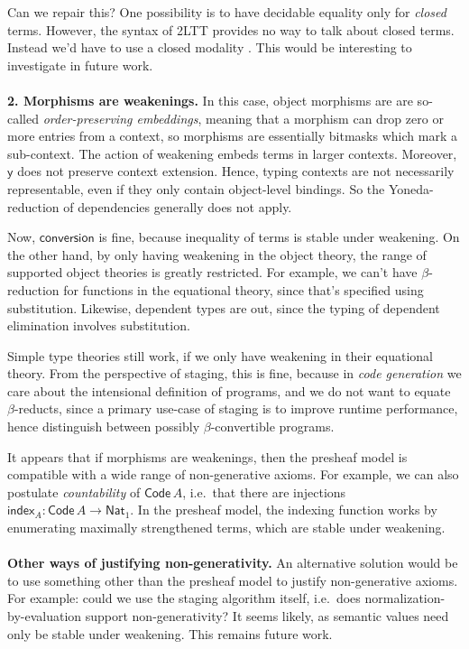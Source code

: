 \documentclass[11pt,a4paper,twoside]{article}
\newcommand{\msf}[1]{\mathsf{#1}}
\newcommand{\Code}{\mathsf{Code}}
\begin{document}
Can we repair this? One possibility is to have decidable equality only for
\emph{closed} terms. However, the syntax of 2LTT provides no way to talk about
closed terms. Instead we'd have to use a closed modality
\cite{bocquet2021induction}. This would be interesting to investigate in future
work.
\\\\
\textbf{2. Morphisms are weakenings.} In this case, object morphisms are are
so-called \emph{order-preserving embeddings}, meaning that a morphism can drop
zero or more entries from a context, so morphisms are essentially bitmasks which
mark a sub-context. The action of weakening embeds terms in larger
contexts. Moreover, $\msf{y}$ does not preserve context extension. Hence,
typing contexts are not necessarily representable, even if they only contain object-level
bindings. So the Yoneda-reduction of dependencies generally does not apply.

Now, $\msf{conversion}$ is fine, because inequality of terms is stable under
weakening. On the other hand, by only having weakening in the object theory, the
range of supported object theories is greatly restricted. For example, we can't
have $\beta$-reduction for functions in the equational theory, since that's
specified using substitution. Likewise, dependent types are out, since the
typing of dependent elimination involves substitution.

Simple type theories still work, if we only have weakening in their equational
theory. From the perspective of staging, this is fine, because in \emph{code
generation} we care about the intensional definition of programs, and we do not
want to equate $\beta$-reducts, since a primary use-case of staging is to
improve runtime performance, hence distinguish between possibly
$\beta$-convertible programs.

It appears that if morphisms are weakenings, then the presheaf model is
compatible with a wide range of non-generative axioms. For example, we can also
postulate \emph{countability} of $\Code\,A$, i.e.\ that there are injections
$\msf{index}_A : \Code\,A \to \msf{Nat}_1$. In the presheaf model, the indexing function
works by enumerating maximally strengthened terms, which are stable under
weakening.
\\\\
\textbf{Other ways of justifying non-generativity.} An alternative solution
would be to use something other than the presheaf model to justify
non-generative axioms. For example: could we use the staging algorithm itself,
i.e.\ does normalization-by-evaluation support non-generativity? It seems
likely, as semantic values need only be stable under weakening. This remains
future work.
\end{document}
